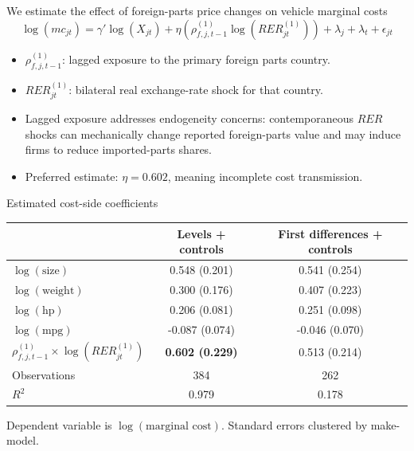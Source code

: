 \documentclass[aspectratio=169,11pt]{beamer}
\begin{document}
\begin{frame}{We estimate the effect of foreign-parts price changes on vehicle marginal costs}
  \[
  \log(mc_{jt})=
  \gamma'\log(X_{jt})
  +\eta\left(\rho^{(1)}_{f,j,t-1}\log(RER^{(1)}_{jt})\right)
  +\lambda_j+\lambda_t+\epsilon_{jt}
  \]
  \vspace{0.15cm}
  \begin{itemize}
    \item \(\rho^{(1)}_{f,j,t-1}\): lagged exposure to the primary foreign parts country.
    \item \(RER^{(1)}_{jt}\): bilateral real exchange-rate shock for that country.
    \item Lagged exposure addresses endogeneity concerns: contemporaneous \(RER\) shocks can mechanically change reported foreign-parts value and may induce firms to reduce imported-parts shares.
    \item Preferred estimate: \(\eta=0.602\), meaning incomplete cost transmission.
  \end{itemize}
\end{frame}

\begin{frame}{Estimated cost-side coefficients}
  \centering
  \small
  \renewcommand{\arraystretch}{1.15}
  \begin{tabular}{lcc}
    \toprule
    & Levels + controls & First differences + controls \\
    \midrule
    \(\log(\text{size})\) & 0.548 (0.201) & 0.541 (0.254) \\
    \(\log(\text{weight})\) & 0.300 (0.176) & 0.407 (0.223) \\
    \(\log(\text{hp})\) & 0.206 (0.081) & 0.251 (0.098) \\
    \(\log(\text{mpg})\) & -0.087 (0.074) & -0.046 (0.070) \\
    \(\rho^{(1)}_{f,j,t-1}\times \log(RER^{(1)}_{jt})\) & \textbf{0.602 (0.229)} & 0.513 (0.214) \\
    \midrule
    Observations & 384 & 262 \\
    \(R^2\) & 0.979 & 0.178 \\
    \bottomrule
  \end{tabular}
  \vspace{0.25cm}
  \par{\scriptsize\textcolor{muted}{Dependent variable is \(\log(\text{marginal cost})\). Standard errors clustered by make-model.}}
\end{frame}
\end{document}
